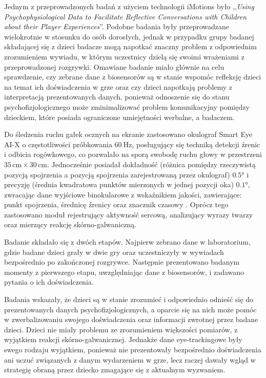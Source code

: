 \documentclass[a4paper,twoside,12pt]{book}
\newcommand{\obcy}[1]{\emph{#1}}
\newcommand{\english}[1]{{\selectlanguage{british}\obcy{#1}}}
\begin{document}
Jednym z przeprowadzonych badań z użyciem technologii iMotions było ,,\english{Using Psychophysiological Data to Facilitate Reflective Conversations with Children about their Player Experiences}''. Podobne badania były przeprowadzane wielokrotnie w stosunku do osób dorosłych, jednak w przypadku grupy badanej składającej się z dzieci badacze mogą napotkać znaczny problem z odpowiednim zrozumieniem wywiadu, w którym uczestnicy dzielą się swoimi wrażeniami z przeprowadzonej rozgrywki. Omawiane badanie miało głównie na celu sprawdzenie, czy zebrane dane z biosensorów są w stanie wspomóc refleksję dzieci na temat ich doświadczenia w grze oraz czy dzieci napotkają problemy z interpretacją prezentowanych danych, ponieważ odnoszenie się do stanu psychofizjologicznego może zminimalizować problem komunikacyjny pomiędzy dzieckiem, które posiada ograniczone umiejętności werbalne, a badaczem.

Do śledzenia ruchu gałek ocznych na ekranie zastosowano okulograf Smart Eye AI-X o częstotliwości próbkowania $60 \ \unit{\hertz}$, posługujący się techniką detekcji źrenic i odbicia rogówkowego, co pozwalało na sporą swobodę ruchu głowy w przestrzeni $35 \, \unit{\centi\metre} \times 30 \, \unit{\centi\metre}$. Jednocześnie posiadał dokładność (różnica pomiędzy rzeczywistą pozycją spojrzenia a pozycją spojrzenia zarejestrowaną przez okulograf) $\ang{0.5}$ i precyzję (średnia kwadratowa punktów mierzonych w jednej pozycji oka) $\ang{0.1}$, zwracając dane wyjściowe binokularowe z wskaźnikiem jakości, zawierające: punkt spojrzenia, średnicę źrenicy oraz znacznik czasowy \cite{bib:iMotions-smart-eye-ai-x}. Oprócz tego zastosowano moduł rejestrujący aktywność sercową, analizujący wyrazy twarzy oraz mierzący reakcję skórno-galwaniczną.

Badanie składało się z dwóch etapów. Najpierw zebrano dane w laboratorium, gdzie badane dzieci grały w dwie gry oraz uczestniczyły w wywiadach bezpośrednio po zakończonej rozgrywce. Następnie prezentowano badanym momenty z pierwszego etapu, uwzględniając dane z biosensorów, i zadawano pytania o ich doświadczenia.

Badania wskazały, że dzieci są w stanie zrozumieć i odpowiednio odnieść się do prezentowanych danych psychofizjologicznych, a oparcie się na nich może pomóc w zwerbalizowaniu swojego doświadczenia oraz informacji zwrotnej przez badane dzieci. Dzieci nie miały problemu ze zrozumieniem większości pomiarów, z wyjątkiem reakcji skórno-galwanicznej. Jednakże dane eye-trackingowe były swego rodzaju wyjątkiem, ponieważ nie prezentowały bezpośrednio doświadczenia ani uczuć związanych z danym wydarzeniem w grze, lecz raczej dawały wgląd w strategię obraną przez dziecko zmagające się z aktualnym wyzwaniem.
\end{document}

